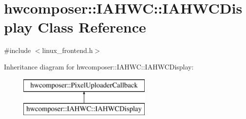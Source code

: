 \hypertarget{classhwcomposer_1_1IAHWC_1_1IAHWCDisplay}{}\section{hwcomposer\+:\+:I\+A\+H\+WC\+:\+:I\+A\+H\+W\+C\+Display Class Reference}
\label{classhwcomposer_1_1IAHWC_1_1IAHWCDisplay}


{\ttfamily \#include $<$linux\+\_\+frontend.\+h$>$}

Inheritance diagram for hwcomposer\+:\+:I\+A\+H\+WC\+:\+:I\+A\+H\+W\+C\+Display\+:\begin{figure}[H]
\begin{center}
\leavevmode
\includegraphics[height=2.000000cm]{classhwcomposer_1_1IAHWC_1_1IAHWCDisplay}
\end{center}
\end{figure}
